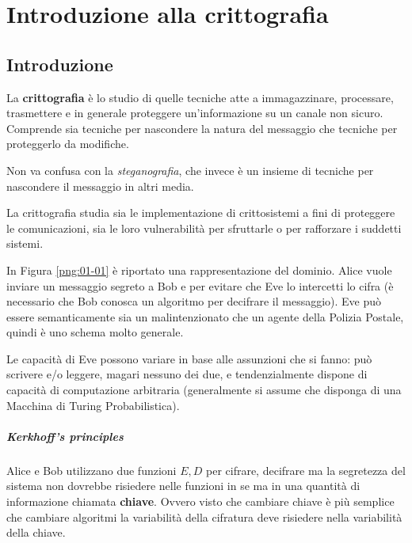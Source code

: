 \chapter{Introduzione alla crittografia}

\section{Introduzione}

La \textbf{crittografia} \`e lo studio di quelle tecniche atte a immagazzinare, processare, trasmettere e in generale proteggere un'informazione su un canale non sicuro. Comprende sia tecniche per nascondere la natura del messaggio che tecniche per proteggerlo da modifiche.

Non va confusa con la \textit{steganografia}, che invece \`e un insieme di tecniche per nascondere il messaggio in altri media.

La crittografia studia sia le implementazione di crittosistemi a fini di proteggere le comunicazioni, sia le loro vulnerabilit\`a per sfruttarle o per rafforzare i suddetti sistemi.


In Figura \ref{png:01-01} \`e riportato una rappresentazione del dominio. Alice vuole inviare un messaggio segreto a Bob e per evitare che Eve lo intercetti lo cifra (\`e necessario che Bob conosca un algoritmo per decifrare il messaggio). Eve pu\`o essere semanticamente sia un malintenzionato che un agente della Polizia Postale, quindi \`e uno schema molto generale.

Le capacit\`a di Eve possono variare in base alle assunzioni che si fanno: pu\`o scrivere e/o leggere, magari nessuno dei due, e tendenzialmente dispone di capacit\`a di computazione arbitraria (generalmente si assume che disponga di una Macchina di Turing Probabilistica).

\paragraph{Kerkhoff's principles}

Alice e Bob utilizzano due funzioni $E, D$ per cifrare, decifrare ma la segretezza del sistema non dovrebbe risiedere nelle funzioni in se ma in una quantit\`a di informazione chiamata \textbf{chiave}. Ovvero visto che cambiare chiave \`e pi\`u semplice che cambiare algoritmi la variabilit\`a della cifratura deve risiedere nella variabilit\`a della chiave.

